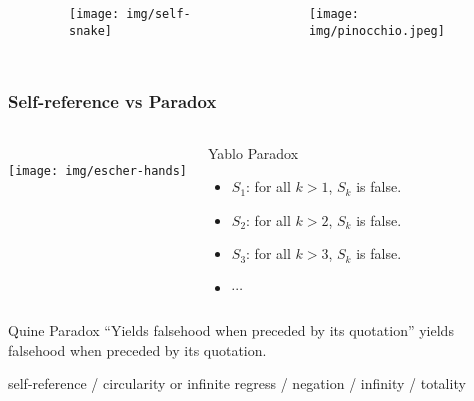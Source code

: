 \documentclass[UTF8,11pt,colorlinks,compress,openany]{beamer}%
\begin{document}
\begin{frame}
\begin{columns}
{\begin{minipage}{\textwidth}
\begin{itemize}
					\end{itemize}
			\end{minipage}}
			\begin{figure}\vspace*{-1.9cm}
				\hspace{-3cm}\texttt{[image: img/self-snake]}
			\end{figure}
			\begin{figure}\vspace*{-0.7cm}
				\hspace{-3cm}\texttt{[image: img/pinocchio.jpeg]}
			\end{figure}
	\end{columns}
\end{frame}

\begin{frame}\frametitle{Self-reference vs Paradox}
	\begin{columns}
			\centering{}\\
			\centering\texttt{[image: img/escher-hands]}\\
			\vspace{-1pt}
			\centering{}
		\vspace*{-2ex}
			\begin{block}{Yablo Paradox}
				\begin{itemize}
					\item $S_1$: for all $k>1$, $S_k$ is false.
					\item $S_2$: for all $k>2$, $S_k$ is false.
					\item $S_3$: for all $k>3$, $S_k$ is false.
					\item $\cdots$
				\end{itemize}
			\end{block}
	\end{columns}
\begin{block}{Quine Paradox}
	``Yields falsehood when preceded by its quotation''	yields falsehood when preceded by its quotation.
\end{block}
\begin{block}{}\small
	self-reference / circularity or infinite regress / negation / infinity / totality
\end{block}
\end{frame}
\end{document}
